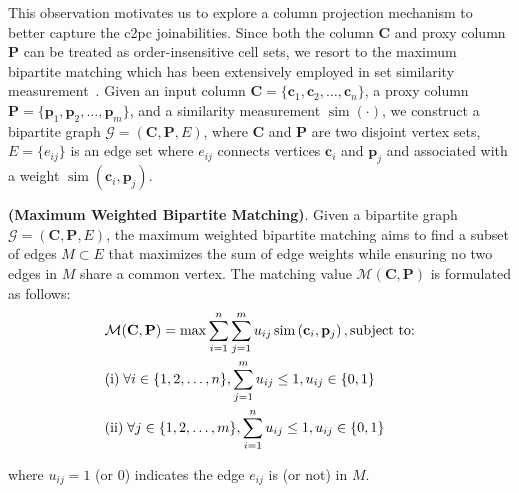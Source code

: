This observation motivates us to explore a column projection mechanism to better capture the c2pc joinabilities. 
Since both the column $\mathbf{C}$ and proxy column $\mathbf{P}$ can be treated as order-insensitive cell sets, we resort to the maximum bipartite matching which has been extensively employed in set similarity measurement~\cite{SilkMoth,TokenJoin}. Given an input column $\mathbf{C} = \{\mathbf{c}_1, \mathbf{c}_2, \dots, \mathbf{c}_n\}$, a proxy column $\mathbf{P} = \{\mathbf{p}_1, \mathbf{p}_2, \dots, \mathbf{p}_m\}$, and a similarity measurement $\operatorname{sim}(\cdot)$, we construct a bipartite graph $\mathcal{G} = (\mathbf{C}, \mathbf{P}, E)$, where $\mathbf{C}$ and $\mathbf{P}$ are two disjoint vertex sets, $E = \{e_{ij}\}$ is an edge set where $e_{ij}$ connects vertices $\mathbf{c}_i$ and $\mathbf{p}_j$ and associated with a weight $\operatorname{sim}(\mathbf{c}_i, \mathbf{p}_j)$.
\begin{myDef}
    \textnormal{\textbf{(Maximum Weighted Bipartite Matching)}}. Given a bipartite graph $\mathcal{G} = (\mathbf{C}, \mathbf{P}, E)$, the maximum weighted bipartite matching aims to
    find a subset of edges   $M \subset E$ that maximizes the sum of edge weights while ensuring no two edges in $M$ share a common vertex. The matching value $\mathcal{M}(\mathbf{C}, \mathbf{P})$ is formulated as follows:
\begin{equation}
\label{eq:BM}
\begin{aligned}
&  {\mathcal{M}}(\mathbf{C}, \mathbf{P})=\max \sum_{i=1}^n \sum_{j=1}^m u_{i j} \operatorname{sim}\left(\mathbf{c}_{i},\mathbf{p}_{j}\right),  \text{subject to:} \\
& \textnormal{(i)} \; \forall  i \in\{1,2, \ldots, n\}, \sum_{j = 1}^m  u_{i j} \leq 1,  u_{i j} \in\{0,1\}\\
& \textnormal{(ii)} \; \forall j \in\{1,2, \ldots, m\}, \sum_{i = 1}^n  u_{i j} \leq 1,  u_{i j} \in\{0,1\}
\end{aligned}
\end{equation}
\end{myDef}
\noindent
where $u_{ij} = 1$ (or $0$) indicates the edge $e_{i j}$ is (or not) in $M$.

